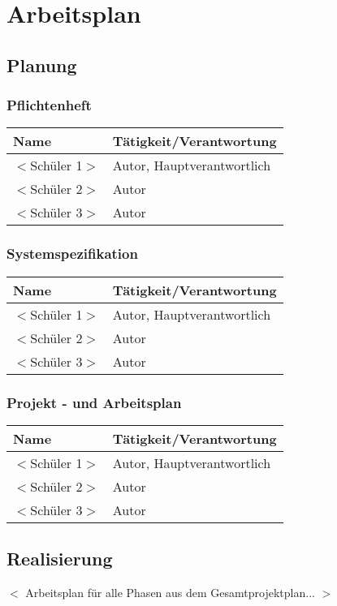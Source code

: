	\chapter{Arbeitsplan}
	\section{Planung}
	\subsection{Pflichtenheft}
	
\begin{tabular}{|l|l|}
	
	\hline
	\textbf{Name} & \textbf{Tätigkeit/Verantwortung}\\
	\hline
	$<$Schüler 1$>$ &  Autor, Hauptverantwortlich \\
	\hline
	$<$Schüler 2$>$ & Autor \\
	\hline
	$<$Schüler 3$>$ & Autor \\
	\hline
\end{tabular}
\label{table1}

\subsection{Systemspezifikation}

\begin{tabular}{|l|l|}
	
	\hline
	\textbf{Name} & \textbf{Tätigkeit/Verantwortung}\\
	\hline
	$<$Schüler 1$>$ &  Autor, Hauptverantwortlich \\
	\hline
	$<$Schüler 2$>$ & Autor \\
	\hline
	$<$Schüler 3$>$ & Autor \\
	\hline
\end{tabular}
\label{table2}

\subsection{Projekt - und Arbeitsplan}

\begin{tabular}{|l|l|}
	
	\hline
	\textbf{Name} & \textbf{Tätigkeit/Verantwortung}\\
	\hline
	$<$Schüler 1$>$ &  Autor, Hauptverantwortlich \\
	\hline
	$<$Schüler 2$>$ & Autor \\
	\hline
	$<$Schüler 3$>$ & Autor \\
	\hline
\end{tabular}
\label{table3}

\section{Realisierung}
$<$ Arbeitsplan für alle Phasen aus dem Gesamtprojektplan... $>$
